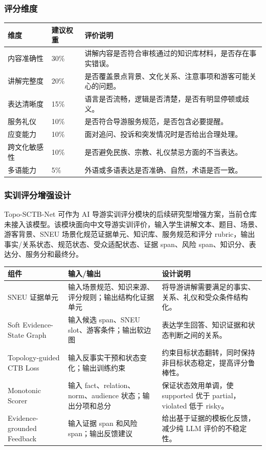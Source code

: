 \subsubsection{评分维度}

\begin{longtable}{p{2.8cm}p{2cm}p{7.8cm}}
\toprule
维度 & 建议权重 & 评价说明 \\
\midrule
内容准确性 & 30\% & 讲解内容是否符合审核通过的知识库材料，是否存在事实错误。 \\
讲解完整度 & 20\% & 是否覆盖景点背景、文化关系、注意事项和游客可能关心的问题。 \\
表达清晰度 & 15\% & 语言是否流畅，逻辑是否清楚，是否有明显停顿或歧义。 \\
服务礼仪 & 10\% & 是否符合导游服务规范，是否包含必要提醒。 \\
应变能力 & 10\% & 面对追问、投诉和突发情况时是否给出合理处理。 \\
跨文化敏感性 & 10\% & 是否避免民族、宗教、礼仪禁忌方面的不当表达。 \\
多语能力 & 5\% & 外语或多语表达是否准确、自然，术语是否一致。 \\
\bottomrule
\end{longtable}
\newpage
\subsubsection{实训评分增强设计}

Topo-SCTB-Net 可作为 AI 导游实训评分模块的后续研究型增强方案，当前仓库未接入该模型。该模块面向中文导游实训评价，输入学生讲解文本、题目、场景、游客背景、SNEU 场景化规范证据单元、知识库、服务规范和评分 rubric，输出事实/关系状态、规范状态、受众适配状态、证据 span、风险 span、知识分、表达分、服务分和最终分。

\begin{longtable}{p{3.2cm}p{4.2cm}p{5.8cm}}
\toprule
组件 & 输入/输出 & 设计说明 \\
\midrule
SNEU 证据单元 & 输入场景规范、知识来源、评分规则；输出结构化证据单元 & 将导游讲解需要满足的事实、关系、礼仪和受众条件结构化。 \\
Soft Evidence-State Graph & 输入候选 span、SNEU slot、游客条件；输出软边图 & 表达学生回答、知识证据和状态判断之间的关系。 \\
Topology-guided CTB Loss & 输入反事实干预和状态变化；输出训练约束 & 约束目标状态翻转，同时保持非目标状态稳定，提高评分鲁棒性。 \\
Monotonic Scorer & 输入 fact、relation、norm、audience 状态；输出分项和总分 & 保证状态效用单调，使 supported 优于 partial，violated 低于 risky。 \\
Evidence-grounded Feedback & 输入证据 span 和风险 span；输出反馈建议 & 给出基于证据的模板化反馈，减少纯 LLM 评价的不稳定性。 \\
\bottomrule
\end{longtable}

